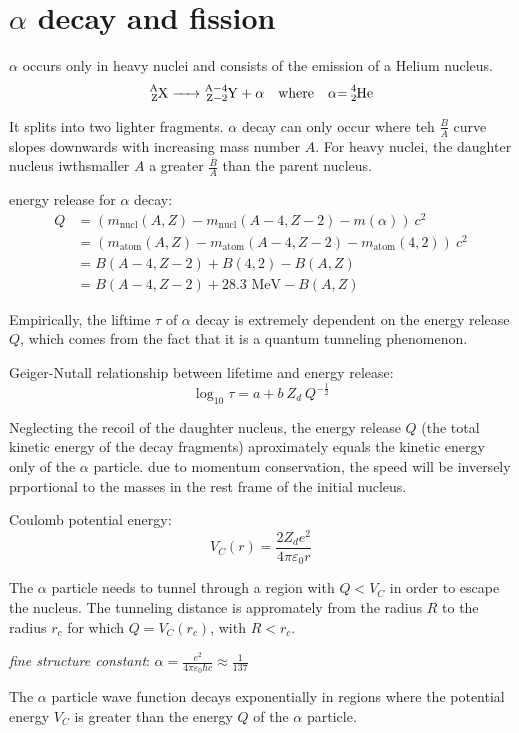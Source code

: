 \documentclass[10pt, a4paper, twocolumn]{article}
\newcommand{\deff}[1]{\par \noindent \textit{#1}: }
\newcommand{\eps}{\ensuremath{\varepsilon _0}}
\begin{document}
\section{$\alpha$ decay and fission}

$\alpha$ occurs only in heavy nuclei and consists of the emission of a Helium nucleus.
\[\ce{
^A_ZX -> ^{A-4}_{Z-2}Y + \alpha}
\qq{where} \ce{\alpha = ^4_2He}\]

It splits into two lighter fragments. $\alpha$ decay can only occur where teh $\frac{B}{A}$ curve slopes downwards with increasing mass number $A$. For heavy nuclei, the daughter nucleus iwthsmaller $A$ a greater $\frac{B}{A}$ than the parent nucleus.

energy release for $\alpha$ decay:
\begin{equation*}
\begin{aligned}
Q&=(m_\text{nucl}(A,Z)
-m_\text{nucl}(A-4,Z-2)-m(\alpha))\ c^2
\\&=(m_\text{atom}(A,Z)
-m_\text{atom}(A-4,Z-2)-m_\text{atom}(4,2))\ c^2
\\&=B(A-4,Z-2)+B(4,2)-B(A,Z)
\\&=B(A-4,Z-2)+28.3\text{ MeV}-B(A,Z)
\end{aligned}
\end{equation*}

Empirically, the liftime $\tau$ of $\alpha$ decay is extremely dependent on the energy release $Q$, which comes from the fact that it is a quantum tunneling phenomenon.

Geiger-Nutall relationship between lifetime and energy release:
\[\log _{10}\tau=a+b\ Z_d\ Q^{-\frac12}\]

Neglecting the recoil of the daughter nucleus, the energy release $Q$ (the total kinetic energy of the decay fragments) aproximately equals the kinetic energy only of the $\alpha $ particle. due to momentum conservation, the speed will be inversely prportional to the masses in the rest frame of the initial nucleus.

Coulomb potential energy:
\[V_C(r)=\frac{2Z_d e^2}{4\pi \eps r}\]

The $\alpha$ particle needs to tunnel through a region with $Q<V_C$ in order to escape the nucleus. The tunneling distance is appromately from the radius $R$ to the radius $r_c$ for which $Q=V_C(r_c)$, with $R<r_c$.

\deff{fine structure constant}
$\displaystyle
\alpha =\frac{e^2}{4\pi\eps\hbar c} \approx \frac{1}{137} $

The $\alpha$ particle wave function decays exponentially in regions where the potential energy $V_C$ is greater than the energy $Q$ of the $\alpha$ particle.
\end{document}
